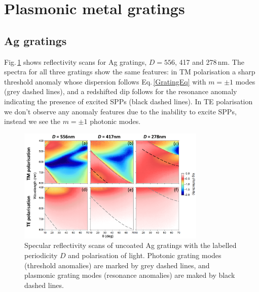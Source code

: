 \section{Plasmonic metal gratings}

\subsection{Ag gratings}
Fig.\,\ref{7Fig7} shows reflectivity scans for Ag gratings, $D=556$, 417 and 278\,nm. The spectra for all three gratings show the same features: in TM polarisation a sharp threshold anomaly whose dispersion follows Eq.\,\ref{GratingEq} with $m=\pm1$ modes (grey dashed lines), and a redshifted dip follows for the resonance anomaly indicating the presence of excited SPPs (black dashed lines). In TE polarisation we don't observe any anomaly features due to the inability to excite SPPs, instead we see the $m=\pm1$ photonic modes.
\begin{figure}[h!] 
\centering    
\includegraphics[width=0.8\textwidth]{Fig7}
\caption[TM and TE specular reflectivity scans of uncoated Ag gratings, $D=556$, 417 and 278\,nm.]{Specular reflectivity scans of uncoated Ag gratings with the labelled periodicity $D$ and polarisation of light. Photonic grating modes (threshold anomalies) are marked by grey dashed lines, and plasmonic grating modes (resonance anomalies) are maked by black dashed lines.}
\label{7Fig7}
\end{figure}

